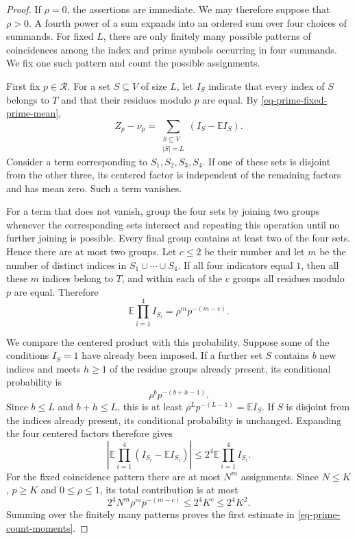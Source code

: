 \documentclass[11pt,reqno]{amsart}
\numberwithin{equation}{section}
\begin{document}
\begin{proof}
If $\rho=0$, the assertions are immediate. We may therefore suppose that $\rho>0$. A fourth power of a sum expands into an ordered sum over four choices of summands. For fixed $L$, there are only finitely many possible patterns of coincidences among the index and prime symbols occurring in four summands. We fix one such pattern and count the possible assignments.

First fix $p\in\mathcal R$. For a set $S\subseteq V$ of size $L$, let $I_S$ indicate that every index of $S$ belongs to $T$ and that their residues modulo $p$ are equal. By \eqref{eq-prime-fixed-prime-mean},
\[
 Z_p-\nu_p
 =\sum_{\substack{S\subseteq V\\|S|=L}}
       (I_S-\mathbb E I_S).
\]
Consider a term corresponding to $S_1,S_2,S_3,S_4$. If one of these sets is disjoint from the other three, its centered factor is independent of the remaining factors and has mean zero. Such a term vanishes.

For a term that does not vanish, group the four sets by joining two groups whenever the corresponding sets intersect and repeating this operation until no further joining is possible. Every final group contains at least two of the four sets. Hence there are at most two groups. Let $c\le2$ be their number and let $m$ be the number of distinct indices in $S_1\cup\cdots\cup S_4$. If all four indicators equal $1$, then all these $m$ indices belong to $T$, and within each of the $c$ groups all residues modulo $p$ are equal. Therefore
\[
 \mathbb E\prod_{i=1}^4 I_{S_i}=\rho^m p^{-(m-c)}.
\]

We compare the centered product with this probability. Suppose some of the conditions $I_S=1$ have already been imposed. If a further set $S$ contains $b$ new indices and meets $h\ge1$ of the residue groups already present, its conditional probability is
\[
 \rho^b p^{-(b+h-1)}.
\]
Since $b\le L$ and $b+h\le L$, this is at least $\rho^L p^{-(L-1)}=\mathbb E I_S$. If $S$ is disjoint from the indices already present, its conditional probability is unchanged. Expanding the four centered factors therefore gives
\[
 \left|\mathbb E\prod_{i=1}^4(I_{S_i}-\mathbb E I_{S_i})\right|
 \le 2^4\mathbb E\prod_{i=1}^4I_{S_i}.
\]
For the fixed coincidence pattern there are at most $N^m$ assignments. Since $N\le K$, $p\ge K$ and $0\le\rho\le1$, its total contribution is at most
\[
 2^4N^m\rho^m p^{-(m-c)}\le2^4K^c\le2^4K^2.
\]
Summing over the finitely many patterns proves the first estimate in \eqref{eq-prime-count-moments}.


\end{proof}
\end{document}
